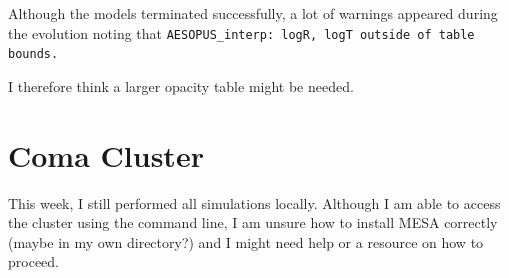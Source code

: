 \documentclass[a4paper,10pt]{article}
\begin{document}
Although the models terminated successfully, a lot of warnings appeared during the evolution noting that
\texttt{AESOPUS_interp: logR, logT outside of table bounds.}

I therefore think a larger opacity table might be needed.

\section{Coma Cluster}

This week, I still performed all simulations locally. Although I am able to access the cluster using the command line, I am unsure how to install MESA correctly (maybe in my own directory?) and I might need help or a resource on how to proceed.


\end{document}
